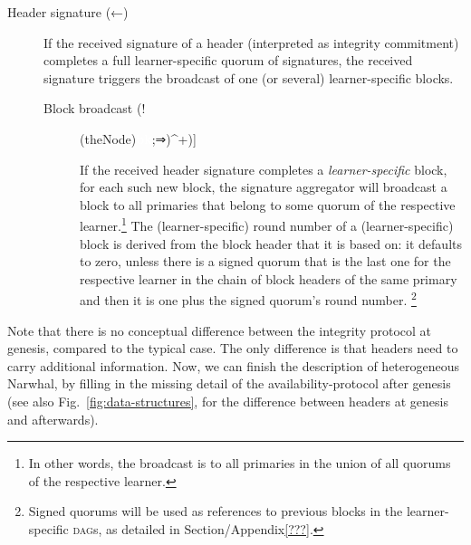 \documentclass[%
dvipsnames
]{article}
\theoremstyle{definition}
\newcommand{\xnote}[1]{
  \marginnote{\footnotesize #1}%
}
\newcommand{\Dag}[1][]{\textsc{dag}#1\xspace}
\newcommand{\fig}[1][]{Fig.~}
\newcommand{\bk}[1][green!60!black]{\tikz[baseline={([yshift=0pt]theNode.base)}]{\node[regular polygon, regular polygon sides=6
,double,inner sep=.5pt,outer sep=0pt,fill=#1] (theNode){\textcolor{white}{\footnotesize \bf bk}};}}
\newcommand{\hd}[1][ ]{%
  \ifthenelse{\equal{#1}{}}%
  {\tikz[baseline={([yshift=0pt]theNode.base)}]{
      \node[rectangle,inner sep=1.5pt,outer sep=0pt,double] (theNode){\textcolor{black}{\footnotesize \bf \ul{HD}}};
    }}%
  {\tikz[baseline={([yshift=0pt]theNode.base)}]{
      \node[rectangle,double,inner sep=1.5pt,outer sep=0pt,double,draw] (theNode){\textcolor{black}{\footnotesize \bf HD}};
    }}%
}
\renewcommand{\todo}[2][]{}
\newcounter{theN}\setcounter{theN}{4}%
\begin{document}
\begin{description}
\item[Header signature (←)]
  \xnote{%
    primary\\
    ←primary
  }
  If the received signature of a header
  (interpreted as {integrity commitment})
  completes a full 
learner-specific quorum of signatures, 
  the received signature triggers the broadcast of one (or several) learner-specific blocks.

\todo{fix inline blocks (see \LaTeX source)}
  \begin{description}
  \item[Block broadcast (!\((\bk⇒)^+\))]
    \xnote{%
      primary \\
      ⇒ primary
    }
    If the received header signature 
    completes a \emph{learner-specific} block, 
    for each such new block, %
    the signature aggregator will broadcast a block
    to all primaries that belong to some quorum of the respective
    learner.\footnote{%
      In other words, 
      the broadcast is to  all primaries in the union of all quorums of
      the respective learner. 
    }
    The (learner-specific) round number of a (learner-specific) block 
    is derived from the block header that it is based on: 
    \todo{double check the following with isaac}%
    it defaults to zero, 
    unless there is a signed quorum that is the last one for the respective learner
    in the chain of block headers of the same primary
    and
    then it is one plus the signed quorum's round number.\xspace%
    \footnote{%
      Signed quorums will be used as references to previous blocks in %
      the learner-specific \Dag[s],
      as detailed in Section/Appendix\ref{???}. %
    }
    \todo{fill in reference}
  \end{description}

\end{description}
Note that there is no conceptual difference between
the integrity protocol at genesis,
compared to the typical case.
The only difference is that headers need to carry 
additional information.
Now, 
we can finish the description of heterogeneous Narwhal,
by filling in the missing detail of the availability-protocol after genesis
(see also \fig\ref{fig:data-structures},
for the difference between headers at genesis and afterwards).
\todo{we need to explain some place the difference in (possibly) using weak links }
\end{document}
